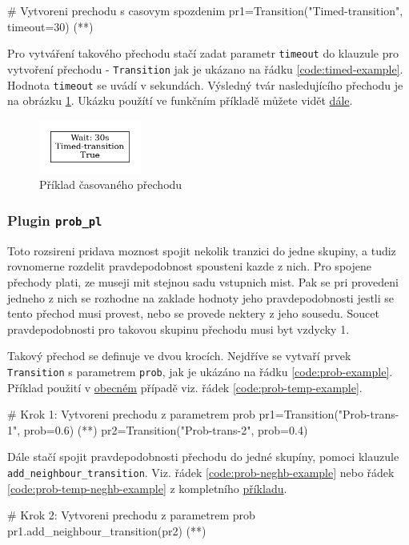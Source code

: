 \begin{python}
  # Vytvoreni prechodu s casovym spozdenim
  pr1=Transition("Timed-transition", timeout=30) (*\label{code:timed-example}*)
\end{python}

Pro vytváření takového přechodu stačí zadat parametr \texttt{timeout} do klauzule pro vytvoření přechodu - \texttt{Transition} jak je ukázano na řádku \ref{code:timed-example}. Hodnota \texttt{timeout} se uvádí v sekundách. Výsledný tvár nasledujícího přechodu je na obrázku \ref{timed-transition}. Ukázku použítí ve funkčním příkladě můžete vidět \hyperref[code:timed-temp-example]{dále}.

\begin{figure}[hbt]
  \centering
  \includegraphics[width=0.3\textwidth]{obrazky-figures/timed-transition.png}
  \caption{Příklad časovaného přechodu}
  \label{timed-transition}
\end{figure}

\subsubsection{Plugin \texttt{prob\_pl}}
\label{subsec:prob_pl}
Toto rozsireni pridava moznost spojit nekolik tranzici do jedne skupiny, a tudiz rovnomerne rozdelit pravdepodobnost spousteni kazde z nich. Pro spojene přechody plati, ze museji mit stejnou sadu vstupnich mist. Pak se pri provedeni jedneho z nich se rozhodne na zaklade hodnoty jeho pravdepodobnosti jestli se tento přechod musi provest, nebo se provede nektery z jeho sousedu. Soucet pravdepodobnosti pro takovou skupinu přechodu musi byt vzdycky 1.

Takový přechod se definuje ve dvou krocích. Nejdříve se vytvaří prvek \texttt{Transition} s parametrem \texttt{prob}, jak je ukázáno na řádku \ref{code:prob-example}. Příklad použití v \hyperref[code:prob-ev-draw]{obecném} případě viz. řádek \ref{code:prob-temp-example}.
\begin{python}
  # Krok 1: Vytvoreni prechodu z parametrem prob
  pr1=Transition("Prob-trans-1", prob=0.6) (*\label{code:prob-example}*)
  pr2=Transition("Prob-trans-2", prob=0.4)
\end{python}

Dále stačí spojit pravdepodobnosti přechodu do jedné skupíny, pomoci klauzule \\ \texttt{add\_neighbour\_transition}. Viz. řádek \ref{code:prob-neghb-example} nebo řádek \ref{code:prob-temp-neghb-example} z kompletního \hyperref[code:prob-ev-draw]{příkladu}.
\begin{python}
  # Krok 2: Vytvoreni prechodu z parametrem prob
  pr1.add_neighbour_transition(pr2) (*\label{code:prob-neghb-example}*)
\end{python}

